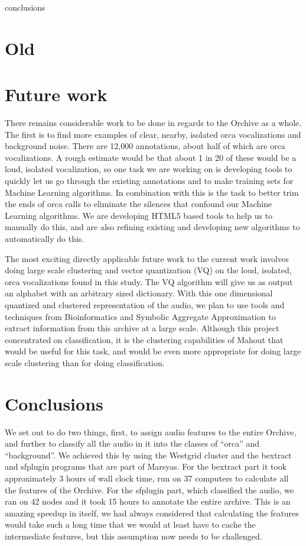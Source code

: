 \label{chapter:conclusion}

conclusions



\section{Old}


\section{Future work}


There remains considerable work to be done in regards to the Orchive
as a whole.  The first is to find more examples of clear, nearby,
isolated orca vocalizations and background noise.  There are 12,000
annotations, about half of which are orca vocalizations.  A rough
estimate would be that about 1 in 20 of these would be a loud,
isolated vocalization, so one task we are working on is developing
tools to quickly let us go through the existing annotations and to
make training sets for Machine Learning algorithms.  In combination
with this is the task to better trim the ends of orca calls to
eliminate the silences that confound our Machine Learning algorithms.
We are developing HTML5 based tools to help us to manually do this,
and are also refining existing and developing new algorithms to
automatically do this.

The most exciting directly applicable future work to the current work
involves doing large scale clustering and vector quantization (VQ) on
the loud, isolated, orca vocalizations found in this study.  The VQ
algorithm will give us as output an alphabet with an arbitrary sized
dictionary.  With this one dimensional quantized and clustered
representation of the audio, we plan to use tools and techniques from
Bioinformatics \cite{sarkar2002} and Symbolic Aggregate Approximation
\cite{lin07} to extract information from this archive at a large scale.
Although this project concentrated on classification, it is the
clustering capabilities of Mahout that would be useful for this task,
and would be even more appropriate for doing large scale clustering
than for doing classification.

\section{Conclusions}

We set out to do two things, first, to assign audio features to the
entire Orchive, and further to classify all the audio in it into the
classes of ``orca'' and ``background''.  We achieved this by using the
Westgrid cluster and the bextract and sfplugin programs that are part
of Marsyas.  For the bextract part it took approximately 3 hours of
wall clock time, run on 37 computers to calculate all the features of
the Orchive.  For the sfplugin part, which classified the audio, we
ran on 42 nodes and it took 15 hours to annotate the entire archive.
This is an amazing speedup in itself, we had always considered that
calculating the features would take such a long time that we would at
least have to cache the intermediate features, but this assumption now
needs to be challenged.

